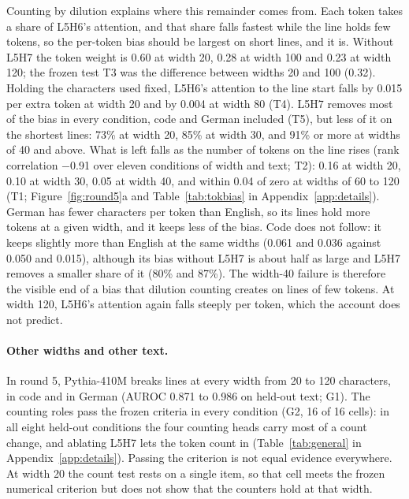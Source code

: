 \documentclass[11pt,a4paper]{article}
\begin{document}
Counting by dilution explains where this remainder comes from. Each token takes a share of L5H6's attention, and that share falls fastest while the line holds few tokens, so the per-token bias should be largest on short lines, and it is. Without L5H7 the token weight is 0.60 at width 20, 0.28 at width 100 and 0.23 at width 120; the frozen test T3 was the difference between widths 20 and 100 (0.32). Holding the characters used fixed, L5H6's attention to the line start falls by 0.015 per extra token at width 20 and by 0.004 at width 80 (T4). L5H7 removes most of the bias in every condition, code and German included (T5), but less of it on the shortest lines: 73\% at width 20, 85\% at width 30, and 91\% or more at widths of 40 and above. What is left falls as the number of tokens on the line rises (rank correlation $-$0.91 over eleven conditions of width and text; T2): 0.16 at width 20, 0.10 at width 30, 0.05 at width 40, and within 0.04 of zero at widths of 60 to 120 (T1; Figure~\ref{fig:round5}a and Table~\ref{tab:tokbias} in Appendix~\ref{app:details}). German has fewer characters per token than English, so its lines hold more tokens at a given width, and it keeps less of the bias. Code does not follow: it keeps slightly more than English at the same widths (0.061 and 0.036 against 0.050 and 0.015), although its bias without L5H7 is about half as large and L5H7 removes a smaller share of it (80\% and 87\%). The width-40 failure is therefore the visible end of a bias that dilution counting creates on lines of few tokens. At width 120, L5H6's attention again falls steeply per token, which the account does not predict.

\paragraph{Other widths and other text.}
In round 5, Pythia-410M breaks lines at every width from 20 to 120 characters, in code and in German (AUROC 0.871 to 0.986 on held-out text; G1). The counting roles pass the frozen criteria in every condition (G2, 16 of 16 cells): in all eight held-out conditions the four counting heads carry most of a count change, and ablating L5H7 lets the token count in (Table~\ref{tab:general} in Appendix~\ref{app:details}). Passing the criterion is not equal evidence everywhere. At width 20 the count test rests on a single item, so that cell meets the frozen numerical criterion but does not show that the counters hold at that width.
\end{document}
